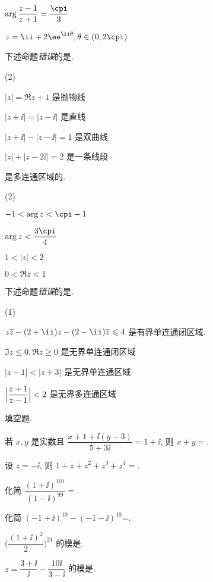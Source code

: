 \begin{homework}
\begin{homework}
\begin{exchoice}
      \item $\arg\dfrac{z-1}{z+1}=\dfrac{\cpi}{3}$
      \item $z=\ii+2\ee^{\ii\theta},\theta\in(0,2\cpi)$
    \end{exchoice}
    \item 下述命题\emph{错误}的是\fillbrace{}.
    \begin{exchoice}(2)
      \item $|z|=\Re z+1$ 是抛物线
      \item $|z+\ii|=|z-\ii|$ 是直线
      \item $|z+\ii|-|z-\ii|=1$ 是双曲线
      \item $|z|+|z-2\ii|=2$ 是一条线段
    \end{exchoice}
    \item \fillbrace{}是多连通区域的.
    \begin{exchoice}(2)
      \item $-1<\arg z<\cpi-1$
      \item $\arg z<\dfrac{3\cpi}4$
      \item $1<|z|<2$
      \item $0<\Re z<1$
    \end{exchoice}
    \item 下述命题\emph{错误}的是\fillbrace{}.
    \begin{exchoice}(1)
      \item $z\ov z-(2+\ii)z-(2-\ii)\ov z\le 4$ 是有界单连通闭区域.
      \item $\Im z\le0,\Re z\ge0$ 是无界单连通闭区域
      \item $|z-1|<|z+3|$ 是无界单连通区域
      \item $\Bigl|\dfrac{z+1}{z-1}\Bigr|<2$ 是无界多连通区域
    \end{exchoice}
  \end{homework}
  \item 填空题.
  \begin{homework}
    \item 若 $x,y$ 是实数且 $\dfrac{x+1+\ii(y-3)}{5+3\ii}=1+\ii$, 则 $x+y=$\fillblank{}.
    \item 设 $z=-\ii$, 则 $1+z+z^2+z^3+z^4=$\fillblank{}.
    \item 化简 $\dfrac{(1+\ii)^{101}}{(1-\ii)^{99}}=$\fillblank{}.
    \item 化简 $(-1+\ii)^{10}-(-1-\ii)^{10}$=\fillblank{}.
    \item $\biggl(\dfrac{(1+\ii)^2}2\biggr)^{21}$ 的模是\fillblank{}.
    \item $z=\dfrac{3+\ii}{\ii}-\dfrac{10\ii}{3-\ii}$ 的模是\fillblank{}.

\end{homework}
\end{homework}
